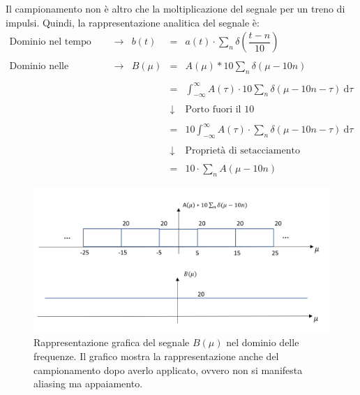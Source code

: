 \documentclass[a4paper]{article}
\begin{document}
	Il campionamento non è altro che la moltiplicazione del segnale per un treno di impulsi. Quindi, la rappresentazione analitica del segnale è:
	\begin{equation*}
		\begin{array}{lllll}
			\text{Dominio nel tempo} & \longrightarrow & b\left(t\right) & = & a\left(t\right) \cdot \displaystyle\sum_{n} \delta\left(\dfrac{t - n}{10}\right) \\
			\\
			\text{Dominio nelle frequenze} & \longrightarrow & B\left(\mu\right) & = & A\left(\mu\right) * 10\displaystyle\sum_{n} \delta\left(\mu - 10n\right)\\
			\\
			&&& = & \int_{-\infty}^{\infty} A\left(\tau\right) \cdot 10\displaystyle\sum_{n} \delta\left(\mu -10n - \tau\right) \: \mathrm{d}\tau \\
			\\
			&&& \downarrow & \text{Porto fuori il } 10 \\
			\\
			&&& = & 10 \int_{-\infty}^{\infty} A\left(\tau\right) \cdot \displaystyle\sum_{n} \delta\left(\mu -10n - \tau\right) \: \mathrm{d}\tau \\
			\\
			&&& \downarrow & \text{Proprietà di setacciamento} \\
			\\
			&&& = & 10 \cdot \displaystyle\sum_{n} A\left(\mu - 10n\right)
		\end{array}
	\end{equation*}
	\begin{figure}[!htp]
		\centering
		\includegraphics[width=\textwidth]{img/fig_8.png}
		\caption*{Rappresentazione grafica del segnale $B\left(\mu\right)$ nel dominio delle frequenze. Il grafico mostra la rappresentazione anche del campionamento dopo averlo applicato, ovvero non si manifesta aliasing ma appaiamento.}
	\end{figure}\newpage
\end{document}
